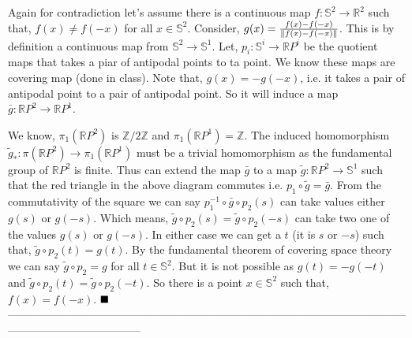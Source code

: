 \documentclass[11pt]{article}
\newcommand{\bb}[1]{\mathbb{#1}}
\newcommand{\Z}{\bb{Z}}
\newcommand{\R}{\mathbb{R}}
\newcommand{\s}{\bb{S}}
\begin{document}
 \vspace*{0.2cm}

 \begin{wrapfigure}{r}{5cm}
\end{wrapfigure}


\noindent Again for contradiction let's assume there is a continuous map $f:\s^2 \to \R^2$ such that, $f(x)\neq f(-x)$ for all $x \in \s^2$. Consider, $g(x) = \frac{f(x)-f(-x)}{\norm{f(x)-f(-x)}}$. This is by definition a continuous map from $\s^2 \to \s^1$. Let, $p_i : \s^i \to \R P^i$ be the quotient maps that takes a piar of antipodal points to ta point. We know these maps are covering map (done in class). Note that, $g(x) = - g(-x)$, i.e. it takes a pair of antipodal point to a pair of antipodal point. So it will induce a map $\bar{g} : \R P^2 \to \R P^1$.

\vspace*{0.2cm}

\noindent We know, $\pi_1(\R P^2)$ is $\Z/2\Z$ and $\pi_1(\R P^1)=\Z$. The induced homomorphism $\tilde{g}_* : \pi(\R P^2) \to \pi_1(\R P^1)$ must be a trivial homomorphism as the fundamental group of $\R P^2$ is finite. Thus can extend the map $\bar{g}$ to a map $\tilde{g} : \R P^2 \to \s^1$ such that the red triangle in the above diagram commutes i.e. $p_1 \circ \tilde{g} = \bar{g}$. From the commutativity of the square we can say $p_1^{-1}\circ \bar{g} \circ p_2(s)$ can take values either $g(s)$ or $g(-s)$. Which means, $\tilde{g} \circ p_2(s)= \tilde{g} \circ p_2(-s)$ can take two one of the values $g(s)$ or $g(-s)$. In either case we can get a $t$ (it is $s$ or $-s$) such that, $\tilde{g} \circ p_2(t) = g(t)$. By the fundamental theorem of covering space theory we can say $\tilde{g} \circ p_2 = g$ for all $t \in \s^2$. But it is not possible as $g(t) = - g(-t)$ and $\tilde{g} \circ p_2(t) = \tilde{g} \circ p_2 (-t)$.  So there is a point $x \in \s^2$ such that, $f(x)=f(-x)$. $\hfill \blacksquare$
------------------------------------------------------------------------------------------------------------------------------------------------
\end{document}
